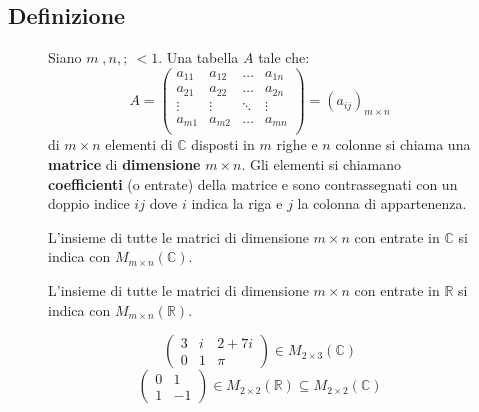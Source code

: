 \documentclass[a4paper]{article}
\theoremstyle{break}
\theoremstyle{break}
\theoremstyle{break}
\theoremstyle{break}
\begin{document}
\subsection{Definizione}
\begin{figure}[H]
	\begin{definition}
		Siano \( m\;,n,;\ < 1 \). Una tabella \( A \) tale che:
		\[
			A = \begin{pmatrix}
				a_{11} & a_{12} & \ldots & a_{1n} \\
				a_{21} & a_{22} & \ldots & a_{2n} \\
				\vdots & \vdots & \ddots & \vdots \\
				a_{m1} & a_{m2} & \ldots & a_{mn} \\
			\end{pmatrix}
			= (a_{ij})_{m \times n}
		\]
		di \( m \times n \) elementi di \( \mathbb{C} \) disposti in \( m \) righe e \( n \) colonne
		si chiama una \textbf{matrice} di \textbf{dimensione} \( m \times n \).
		Gli elementi si chiamano \textbf{coefficienti} (o entrate) della matrice e sono
		contrassegnati con un doppio indice \( ij \) dove \( i \) indica la riga e \( j \)
		la colonna di appartenenza.

		\vspace{0.5cm}
		L'insieme di tutte le matrici di dimensione \( m \times n \) con entrate in \( \mathbb{C} \)
		si indica con \( M_{m \times n}(\mathbb{C}) \).

		\vspace{0.5cm}
		L'insieme di tutte le matrici di dimensione \( m \times n \) con entrate in \( \mathbb{R} \)
		si indica con \( M_{m \times n}(\mathbb{R}) \).
	\end{definition}
\end{figure}

\begin{figure}[H]
	\begin{example}
		\[
			\begin{pmatrix} 3 & i & 2+7i \\
                0 & 1 & \pi
			\end{pmatrix} \in M_{2 \times 3}(\mathbb{C})
		\]
		\[
			\begin{pmatrix}
				0 & 1  \\
				1 & -1
			\end{pmatrix} \in M_{2 \times 2}(\mathbb{R}) \subseteq M_{2 \times 2}(\mathbb{C})
		\]
	\end{example}
\end{figure}
\end{document}
